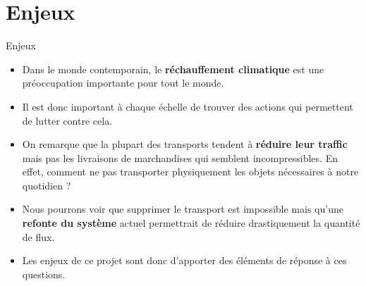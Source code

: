 \documentclass[8pt, aspectratio=169]{beamer}
\begin{document}
\section{Enjeux}
\begin{frame}{Enjeux}
\makeatletter
      \begin{minipage}[c][\textheight]{\textwidth}
      \begin{itemize}
        \item Dans le monde contemporain, le \textbf{réchauffement climatique} est une préoccupation importante pour tout le monde.
        \saut
        
        \item Il est donc important à chaque échelle de trouver des actions qui permettent de lutter contre cela.
        \saut
        
        \item On remarque que la plupart des transports tendent à \textbf{réduire leur traffic} mais pas les livraisons de marchandises qui semblent incompressibles. En effet, comment ne pas transporter physiquement les objets nécessaires à notre quotidien ?
        \saut
        
        \item Nous pourrons voir que supprimer le transport est impossible mais qu'une \textbf{refonte du système} actuel permettrait de réduire drastiquement la quantité de flux.
        \saut
        
        \item Les enjeux de ce projet sont donc d'apporter des éléments de réponse à ces questions.
        \end{itemize}
      \end{minipage}
\end{frame}


\end{document}
